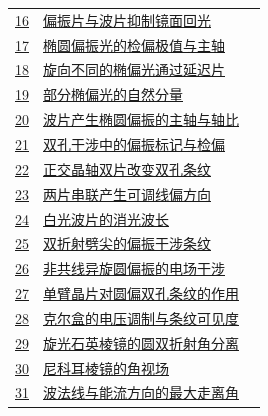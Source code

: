 \documentclass[UTF8,fontset=fandol,a4paper,11pt]{ctexart}
\begin{document}
\begin{longtable}{@{}r p{113mm} r@{}}
\hyperref[q:16]{16} & \hyperref[q:16]{偏振片与波片抑制镜面回光} & \pageref{q:16} \\

\hyperref[q:17]{17} & \hyperref[q:17]{椭圆偏振光的检偏极值与主轴} & \pageref{q:17} \\

\hyperref[q:18]{18} & \hyperref[q:18]{旋向不同的椭偏光通过延迟片} & \pageref{q:18} \\

\hyperref[q:19]{19} & \hyperref[q:19]{部分椭偏光的自然分量} & \pageref{q:19} \\

\hyperref[q:20]{20} & \hyperref[q:20]{波片产生椭圆偏振的主轴与轴比} & \pageref{q:20} \\

\hyperref[q:21]{21} & \hyperref[q:21]{双孔干涉中的偏振标记与检偏} & \pageref{q:21} \\

\hyperref[q:22]{22} & \hyperref[q:22]{正交晶轴双片改变双孔条纹} & \pageref{q:22} \\

\hyperref[q:23]{23} & \hyperref[q:23]{两片串联产生可调线偏方向} & \pageref{q:23} \\

\hyperref[q:24]{24} & \hyperref[q:24]{白光波片的消光波长} & \pageref{q:24} \\

\hyperref[q:25]{25} & \hyperref[q:25]{双折射劈尖的偏振干涉条纹} & \pageref{q:25} \\

\hyperref[q:26]{26} & \hyperref[q:26]{非共线异旋圆偏振的电场干涉} & \pageref{q:26} \\

\hyperref[q:27]{27} & \hyperref[q:27]{单臂晶片对圆偏双孔条纹的作用} & \pageref{q:27} \\

\hyperref[q:28]{28} & \hyperref[q:28]{克尔盒的电压调制与条纹可见度} & \pageref{q:28} \\

\hyperref[q:29]{29} & \hyperref[q:29]{旋光石英棱镜的圆双折射角分离} & \pageref{q:29} \\

\hyperref[q:30]{30} & \hyperref[q:30]{尼科耳棱镜的角视场} & \pageref{q:30} \\

\hyperref[q:31]{31} & \hyperref[q:31]{波法线与能流方向的最大走离角} & \pageref{q:31} \\


\end{longtable}
\end{document}
